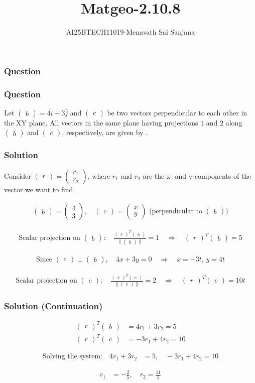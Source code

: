 \documentclass{beamer}
\title{Matgeo-2.10.8}
\author{AI25BTECH11019-Menavath Sai Sanjana}
\date{}
\theoremstyle{remark}
\providecommand{\norm}[1]{\lVert#1\rVert}
\renewcommand{\vec}[1]{\begin{pmatrix}#1\end{pmatrix}}
\begin{document}
\begin{frame}
\titlepage
\end{frame}

\begin{frame}
\frametitle{Question}

\frametitle{Question}
Let $\vec{b} = 4\hat{i} + 3\hat{j}$ and $\vec{c}$ be two vectors perpendicular to each other in the XY plane. All vectors in the same plane having projections $1$ and $2$ along $\vec{b}$ and $\vec{c}$, respectively, are given by .
\end{frame}

\begin{frame}
\frametitle{Solution}
Consider $\vec{r} = \vec{r_1\\r_2}$, where $r_1$ and $r_2$ are the x- and y-components of the vector we want to find.

\begin{align}
\vec{b} = \vec{4\\3}, \quad
\vec{c} = \vec{x\\y} \text{ (perpendicular to } \vec{b}\text{)}
\end{align}

\begin{align}
\text{Scalar projection on } \vec{b}: \quad 
\frac{\vec{r}^T \vec{b}}{\norm{\vec{b}}} = 1 
\quad \Rightarrow \quad \vec{r}^T \vec{b} = 5
\end{align}

\begin{align}
\text{Since } \vec{c} \perp \vec{b}, \quad 4x + 3y = 0 
\quad \Rightarrow \quad x = -3t, \, y = 4t
\end{align}
     
\begin{align}
\text{Scalar projection on } \vec{c}: \quad
\frac{\vec{r}^T \vec{c}}{\norm{\vec{c}}} = 2 
\quad \Rightarrow \quad \vec{r}^T \vec{c} = 10t
\end{align}
\end{frame}

\begin{frame}
\frametitle{Solution (Continuation)}
\begin{align}
\vec{r}^T \vec{b} &= 4 r_1 + 3 r_2 = 5 \\
\vec{r}^T \vec{c} &= -3 r_1 + 4 r_2 = 10
\end{align}

\begin{align}
\text{Solving the system:} \quad
4 r_1 + 3 r_2 &= 5, \quad -3 r_1 + 4 r_2 = 10
\end{align}

\begin{align}
r_1 &= -\frac{2}{5}, \quad r_2 = \frac{11}{5}
\end{align}
\end{frame}
\end{document}
